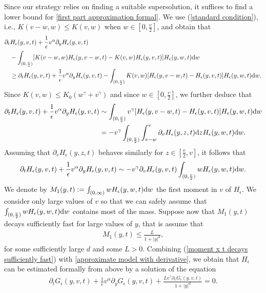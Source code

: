 \documentclass[11pt]{article}
\numberwithin{equation}{section}
\newcommand{\der}{\textup{d}}
\begin{document}
Since our strategy relies on finding a suitable supersolution, it suffices to find a lower bound for \eqref{first part approximation formal}. We use (\ref{standard condition}), i.e., $K(v-w,w)\leq K(v,w)$ when $w\in[0,\frac{v}{2}]$, and obtain that
\begin{align}
\partial_{t}& H_{\epsilon}(y,v,t)+\frac{1}{\epsilon}v^{\alpha}\partial_{y}H_{\epsilon}(y,v,t) \nonumber\\
    &-\int_{(0,\frac{v}{2})}[K(v-w,w)H_{\epsilon}(y,v-w,t)-K(v,w)H_{\epsilon}(y,v,t)]H_{\epsilon}(y,w,t)\der w\label{this is where the assumption is needed}\\
    &\geq \partial_{t}H_{\epsilon}(y,v,t)+\frac{1}{\epsilon}v^{\alpha}\partial_{y}H_{\epsilon}(y,v,t) -\int_{(0,\frac{v}{2})}K(v,w)[H_{\epsilon}(y,v-w,t)-H_{\epsilon}(y,v,t)]H_{\epsilon}(y,w,t)\der w.\nonumber
\end{align}
    Since $K(v,w)\leq K_{0}(w^{\gamma}+v^{\gamma})$ and since $w\in[0,\frac{v}{2}]$, we further deduce that
    \begin{align}\label{approximation derivation}
\partial_{t}H_{\epsilon}(y,v,t)+\frac{1}{\epsilon}v^{\alpha}\partial_{y}H_{\epsilon}(y,v,t)   &\sim\int_{(0,\frac{v}{2})}v^{\gamma}[H_{\epsilon}(y,v-w,t)-H_{\epsilon}(y,v,t)]H_{\epsilon}(y,w,t)\der w\nonumber\\
&= - v^{\gamma}\int_{(0,\frac{v}{2})}\int_{v-w}^{v}\partial_{v}H_{\epsilon}(y,z,t)\der z H_{\epsilon}(y,w,t)\der w.
\end{align}
Assuming that $\partial_{v}H_{\epsilon}(y,z,t)$ behaves similarly for $z\in[\frac{v}{2},v]$, it follows that
\begin{align}\label{approximate model with derivative}
\partial_{t} H_{\epsilon}(y,v,t)+\frac{1}{\epsilon}v^{\alpha}\partial_{y}H_{\epsilon}(y,v,t)  \sim -v^{\gamma}\partial_{v} H_{\epsilon}(y,v,t)\int_{(0,\frac{v}{2})}wH_{\epsilon}(y,w,t)\der w.
\end{align}
We denote by
$M_1(y,t):=\int_{(0,\infty)}wH_{\epsilon}(y,w,t)\der w$ the first moment in $v$ of $H_{\epsilon}$. We consider only large values of $v$ so that we can safely assume that $\int_{(0,\frac{v}{2})}wH_{\epsilon}(y,w,t)\der w$ contains most of the mass. Suppose now that $M_1(y,t)$ decays sufficiently fast for large values of $y$, that is 
assume that 
\begin{align}\label{moment x t decays sufficiently fast}
    M_1(y,t)\leq \frac{L}{1+|y|^{d}},
\end{align}
for some sufficiently large $d$ and some $L>0$. Combining (\ref{moment x t decays sufficiently fast}) with \eqref{approximate model with derivative}, we obtain that $H_{\epsilon}$ can be estimated formally from above by a solution of the equation
\begin{align}\label{approximate model}
\partial_{t} G_{\epsilon}(y,v,t)+\frac{1}{\epsilon}v^{\alpha}\partial_{y}G_{\epsilon}(y,v,t)   +\frac{
    Lv^{\gamma}\partial_v G_{\epsilon}(y,v,t)}{1+|y|^{d}}=0.
\end{align}
\end{document}
